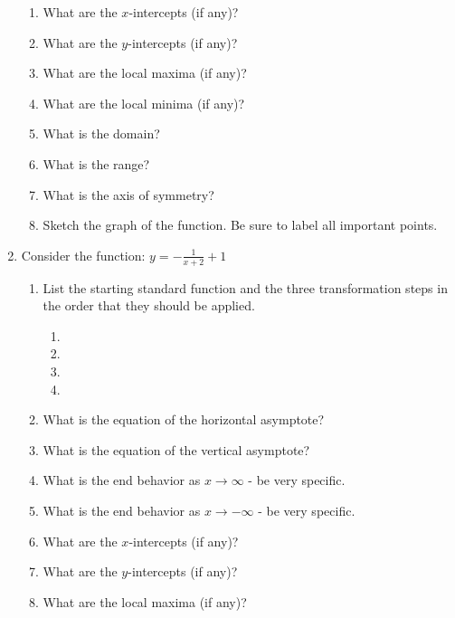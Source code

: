 \documentclass[letterpaper,12pt,fleqn]{article}
\begin{document}
\begin{enumerate}
\begin{enumerate}
  \item What are the $x$-intercepts (if any)?
    
  \item What are the $y$-intercepts (if any)?

  \item What are the local maxima (if any)?

  \item What are the local minima (if any)?

  \item What is the domain?

  \item What is the range?

  \item What is the axis of symmetry?

  \item Sketch the graph of the function. Be sure to label all important
    points.
  \end{enumerate}

\item Consider the function: $y=-\frac{1}{x+2}+1$
  \begin{enumerate}
  \item List the starting standard function and the three transformation
    steps in the order that they should be applied.
    \begin{enumerate}
    \item
    \item
    \item
    \item
    \end{enumerate}

  \item What is the equation of the horizontal asymptote?

  \item What is the equation of the vertical asymptote?

  \item What is the end behavior as $x\to\infty$ - be very specific.

  \item What is the end behavior as $x\to-\infty$ - be very specific.

  \item What are the $x$-intercepts (if any)?
    
  \item What are the $y$-intercepts (if any)?

  \item What are the local maxima (if any)?


\end{enumerate}
\end{enumerate}
\end{document}
